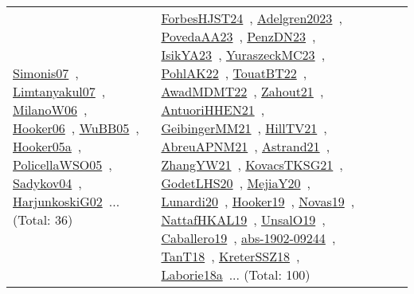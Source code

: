 {\begin{longtable}{lp{3cm}>{\raggedright\arraybackslash}p{6cm}>{\raggedright\arraybackslash}p{6cm}>{\raggedright\arraybackslash}p{8cm}}
\href{../works/Simonis07.pdf}{Simonis07}~\cite{Simonis07}, \href{../works/Limtanyakul07.pdf}{Limtanyakul07}~\cite{Limtanyakul07}, \href{../works/MilanoW06.pdf}{MilanoW06}~\cite{MilanoW06}, \href{../works/Hooker06.pdf}{Hooker06}~\cite{Hooker06}, \href{../works/WuBB05.pdf}{WuBB05}~\cite{WuBB05}, \href{../works/Hooker05a.pdf}{Hooker05a}~\cite{Hooker05a}, \href{../works/PolicellaWSO05.pdf}{PolicellaWSO05}~\cite{PolicellaWSO05}, \href{../works/Sadykov04.pdf}{Sadykov04}~\cite{Sadykov04}, \href{../works/HarjunkoskiG02.pdf}{HarjunkoskiG02}~\cite{HarjunkoskiG02}... (Total: 36) & \href{../works/ForbesHJST24.pdf}{ForbesHJST24}~\cite{ForbesHJST24}, \href{../works/Adelgren2023.pdf}{Adelgren2023}~\cite{Adelgren2023}, \href{../works/PovedaAA23.pdf}{PovedaAA23}~\cite{PovedaAA23}, \href{../works/PenzDN23.pdf}{PenzDN23}~\cite{PenzDN23}, \href{../works/IsikYA23.pdf}{IsikYA23}~\cite{IsikYA23}, \href{../works/YuraszeckMC23.pdf}{YuraszeckMC23}~\cite{YuraszeckMC23}, \href{../works/PohlAK22.pdf}{PohlAK22}~\cite{PohlAK22}, \href{../works/TouatBT22.pdf}{TouatBT22}~\cite{TouatBT22}, \href{../works/AwadMDMT22.pdf}{AwadMDMT22}~\cite{AwadMDMT22}, \href{../works/Zahout21.pdf}{Zahout21}~\cite{Zahout21}, \href{../works/AntuoriHHEN21.pdf}{AntuoriHHEN21}~\cite{AntuoriHHEN21}, \href{../works/GeibingerMM21.pdf}{GeibingerMM21}~\cite{GeibingerMM21}, \href{../works/HillTV21.pdf}{HillTV21}~\cite{HillTV21}, \href{../works/AbreuAPNM21.pdf}{AbreuAPNM21}~\cite{AbreuAPNM21}, \href{../works/Astrand21.pdf}{Astrand21}~\cite{Astrand21}, \href{../works/ZhangYW21.pdf}{ZhangYW21}~\cite{ZhangYW21}, \href{../works/KovacsTKSG21.pdf}{KovacsTKSG21}~\cite{KovacsTKSG21}, \href{../works/GodetLHS20.pdf}{GodetLHS20}~\cite{GodetLHS20}, \href{../works/MejiaY20.pdf}{MejiaY20}~\cite{MejiaY20}, \href{../works/Lunardi20.pdf}{Lunardi20}~\cite{Lunardi20}, \href{../works/Hooker19.pdf}{Hooker19}~\cite{Hooker19}, \href{../works/Novas19.pdf}{Novas19}~\cite{Novas19}, \href{../works/NattafHKAL19.pdf}{NattafHKAL19}~\cite{NattafHKAL19}, \href{../works/UnsalO19.pdf}{UnsalO19}~\cite{UnsalO19}, \href{../works/Caballero19.pdf}{Caballero19}~\cite{Caballero19}, \href{../works/abs-1902-09244.pdf}{abs-1902-09244}~\cite{abs-1902-09244}, \href{../works/TanT18.pdf}{TanT18}~\cite{TanT18}, \href{../works/KreterSSZ18.pdf}{KreterSSZ18}~\cite{KreterSSZ18}, \href{../works/Laborie18a.pdf}{Laborie18a}~\cite{Laborie18a}... (Total: 100)\\

\end{longtable}}
